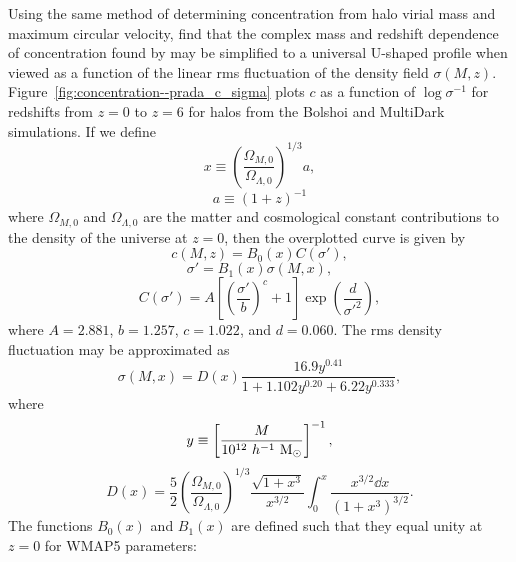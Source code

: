 Using the same method of determining concentration from halo virial mass and maximum circular velocity, \citet{2012MNRAS.423.3018P} find that the complex mass and redshift dependence of concentration found by \citet{2011ApJ...740..102K} may be simplified to a universal U-shaped profile when viewed as a function of the linear rms fluctuation of the density field $\sigma(M,z)$.  Figure~\ref{fig:concentration--prada_c_sigma} plots $c$ as a function of $\log \sigma^{-1}$ for redshifts from $z = 0$ to $z = 6$ for halos from the Bolshoi \citep{2011ApJ...740..102K} and MultiDark \citep{2012MNRAS.423.3018P} simulations.  If we define
\begin{equation}
	x \equiv \left( \frac{\Omega_{M,0}}{\Omega_{\Lambda,0}} \right)^{1/3} a,
\end{equation}
\begin{equation}
	a \equiv (1 + z)^{-1}
\end{equation}
where $\Omega_{M,0}$ and $\Omega_{\Lambda,0}$ are the matter and cosmological constant contributions to the density of the universe at $z = 0$, then the overplotted curve is given by
\begin{equation} \label{eq:early_universe--prada_universal_sigma}
	c(M,z) = B_{0}(x)C(\sigma'),
\end{equation}
\begin{equation}
	\sigma' = B_{1}(x) \sigma(M,x),
\end{equation}
\begin{equation} \label{eq:early_universe--prada_universal_sigma_scaled}
	C(\sigma') = A \left[ \left( \frac{\sigma'}{b} \right)^{c} + 1 \right] \exp\left( \frac{d}{\sigma'^{2}} \right),
\end{equation}
where $A = 2.881$, $b = 1.257$, $c = 1.022$, and $d = 0.060$.  The rms density fluctuation may be approximated as
\begin{equation}
	\sigma(M,x) = D(x) \frac{16.9 y^{0.41}}{1 + 1.102 y^{0.20} + 6.22 y^{0.333}},
\end{equation}
where
\begin{equation}
	y \equiv \left[ \frac{M}{10^{12}\ h^{-1}\ \Msun} \right]^{-1},
\end{equation}
\begin{equation}
	D(x) = \frac{5}{2} \left( \frac{\Omega_{M,0}}{\Omega_{\Lambda,0}} \right)^{1/3} \frac{\sqrt{1 + x^{3}}}{x^{3/2}} \int_{0}^{x} \frac{x^{3/2} \dd x}{(1 + x^{3})^{3/2}}.
\end{equation}
The functions $B_{0}(x)$ and $B_{1}(x)$ are defined such that they equal unity at $z = 0$ for WMAP5 parameters:
